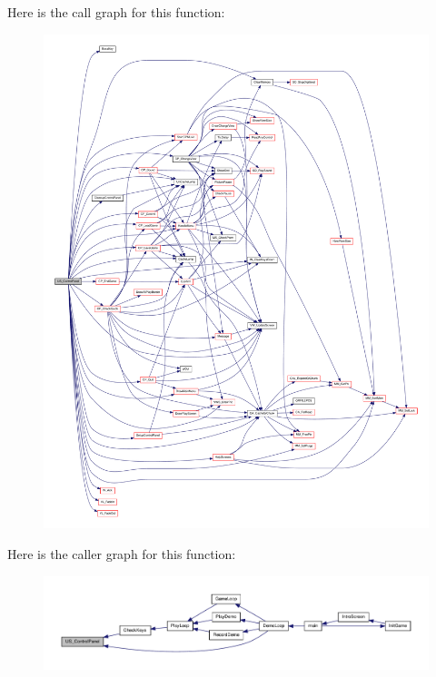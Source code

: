 Here is the call graph for this function:
\nopagebreak
\begin{figure}[H]
\begin{center}
\leavevmode
\includegraphics[width=400pt]{WL__DEF_8H_a70713817c5ea4074fc8d3f6c0f9aadbe_cgraph}
\end{center}
\end{figure}




Here is the caller graph for this function:
\nopagebreak
\begin{figure}[H]
\begin{center}
\leavevmode
\includegraphics[width=400pt]{WL__DEF_8H_a70713817c5ea4074fc8d3f6c0f9aadbe_icgraph}
\end{center}
\end{figure}


